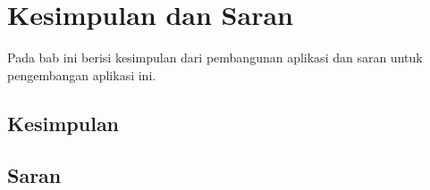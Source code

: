 \chapter{Kesimpulan dan Saran}
\label{chap:kesimpulan_dan_saran}

Pada bab ini berisi kesimpulan dari pembangunan aplikasi dan saran untuk pengembangan aplikasi ini.

\section{Kesimpulan}
\label{sec:kesimpulan}


\section{Saran}
\label{sec:saran}
